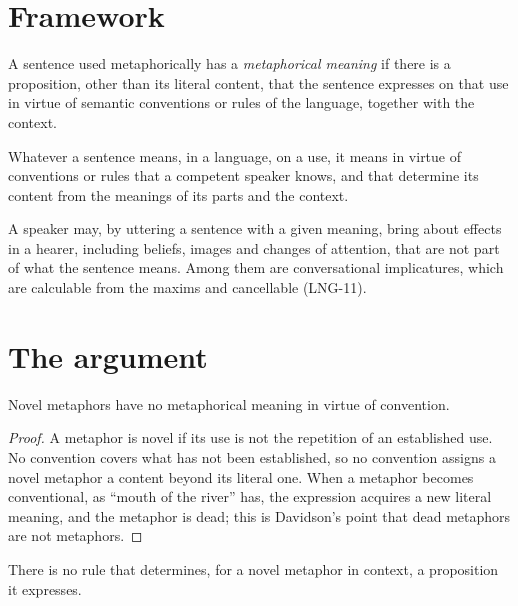 \documentclass{situationist-preprint}
\begin{document}
\section{Framework}

\begin{definition}\label{d:mm}
A sentence used metaphorically has a \emph{metaphorical meaning} if there is a proposition, other than its literal content, that the sentence expresses on that use in virtue of semantic conventions or rules of the language, together with the context.
\end{definition}

\begin{principle}\label{p:rules}
Whatever a sentence means, in a language, on a use, it means in virtue of conventions or rules that a competent speaker knows, and that determine its content from the meanings of its parts and the context.
\end{principle}

\begin{principle}[Use]\label{p:use}
A speaker may, by uttering a sentence with a given meaning, bring about effects in a hearer, including beliefs, images and changes of attention, that are not part of what the sentence means. Among them are conversational implicatures, which are calculable from the maxims and cancellable (LNG-11).
\end{principle}

\section{The argument}

\begin{lemma}\label{l:novel}
Novel metaphors have no metaphorical meaning in virtue of convention.
\end{lemma}

\begin{proof}
A metaphor is novel if its use is not the repetition of an established use. No convention covers what has not been established, so no convention assigns a novel metaphor a content beyond its literal one. When a metaphor becomes conventional, as \enquote{mouth of the river} has, the expression acquires a new literal meaning, and the metaphor is dead; this is Davidson's point that dead metaphors are not metaphors.
\end{proof}

\begin{lemma}\label{l:rules}
There is no rule that determines, for a novel metaphor in context, a proposition it expresses.
\end{lemma}
\end{document}
